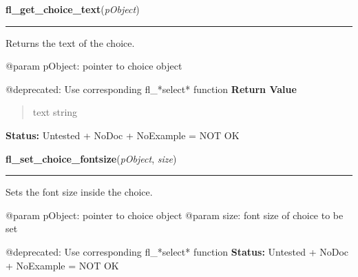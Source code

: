     \label{xformslib:deprecated:fl_get_choice_text}

    \vspace{0.5ex}

\hspace{.8\funcindent}\begin{boxedminipage}{\funcwidth}

    \raggedright \textbf{fl\_get\_choice\_text}(\textit{pObject})

    \vspace{-1.5ex}

    \rule{\textwidth}{0.5\fboxrule}
\setlength{\parskip}{2ex}

Returns the text of the choice.

@param pObject: pointer to choice object

@deprecated: Use corresponding fl\_*select* function
\setlength{\parskip}{1ex}
      \textbf{Return Value}
    \vspace{-1ex}

      \begin{quote}

text string
      \end{quote}

\textbf{Status:} 
Untested + NoDoc + NoExample = NOT OK


    \end{boxedminipage}

    \label{xformslib:deprecated:fl_set_choice_fontsize}

    \vspace{0.5ex}

\hspace{.8\funcindent}\begin{boxedminipage}{\funcwidth}

    \raggedright \textbf{fl\_set\_choice\_fontsize}(\textit{pObject}, \textit{size})

    \vspace{-1.5ex}

    \rule{\textwidth}{0.5\fboxrule}
\setlength{\parskip}{2ex}

Sets the font size inside the choice.

@param pObject: pointer to choice object
@param size: font size of choice to be set

@deprecated: Use corresponding fl\_*select* function
\setlength{\parskip}{1ex}
\textbf{Status:} 
Untested + NoDoc + NoExample = NOT OK


    \end{boxedminipage}

